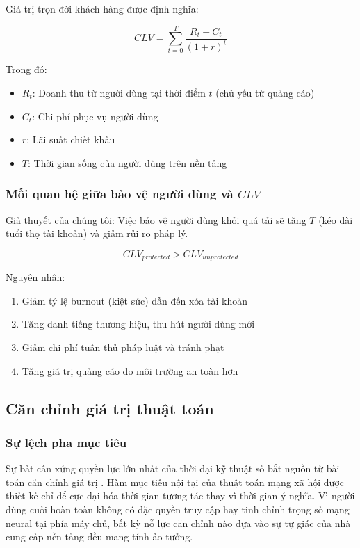Giá trị trọn đời khách hàng được định nghĩa:

\begin{equation}
    CLV = \sum_{t=0}^{T} \frac{R_t - C_t}{(1+r)^t}
\end{equation}

Trong đó:
\begin{itemize}
    \item $R_t$: Doanh thu từ người dùng tại thời điểm $t$ (chủ yếu từ quảng cáo)
    \item $C_t$: Chi phí phục vụ người dùng
    \item $r$: Lãi suất chiết khấu
    \item $T$: Thời gian sống của người dùng trên nền tảng
\end{itemize}

\subsubsection{Mối quan hệ giữa bảo vệ người dùng và $CLV$}

Giả thuyết của chúng tôi: Việc bảo vệ người dùng khỏi quá tải sẽ tăng $T$ (kéo dài tuổi thọ tài khoản) và giảm rủi ro pháp lý.

\begin{equation}
    CLV_{protected} > CLV_{unprotected}
\end{equation}

Nguyên nhân:
\begin{enumerate}
    \item Giảm tỷ lệ burnout (kiệt sức) dẫn đến xóa tài khoản
    \item Tăng danh tiếng thương hiệu, thu hút người dùng mới
    \item Giảm chi phí tuân thủ pháp luật và tránh phạt
    \item Tăng giá trị quảng cáo do môi trường an toàn hơn
\end{enumerate}

\subsection{Căn chỉnh giá trị thuật toán}

\subsubsection{Sự lệch pha mục tiêu}

Sự bất cân xứng quyền lực lớn nhất của thời đại kỹ thuật số bắt nguồn từ bài toán căn chỉnh giá trị \cite{stray2021}. Hàm mục tiêu nội tại của thuật toán mạng xã hội được thiết kế chỉ để cực đại hóa thời gian tương tác thay vì thời gian ý nghĩa. Vì người dùng cuối hoàn toàn không có đặc quyền truy cập hay tinh chỉnh trọng số mạng neural tại phía máy chủ, bất kỳ nỗ lực căn chỉnh nào dựa vào sự tự giác của nhà cung cấp nền tảng đều mang tính ảo tưởng.

